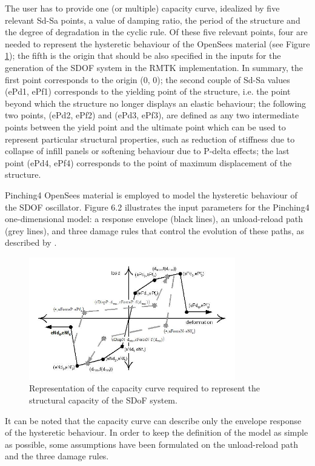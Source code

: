 The user has to provide one (or multiple) capacity curve, idealized by five relevant Sd-Sa points, a value of damping ratio, the period of the structure and the degree of degradation in the cyclic rule. Of these five relevant points, four are needed to represent the hysteretic behaviour of the OpenSees material (see Figure \ref{fig:backbone}); the fifth is the origin that should be also specified in the inputs for the generation of the SDOF system in the RMTK implementation. In summary, the first point corresponds to the origin (0, 0); the second couple of Sd-Sa values (ePd1, ePf1) corresponds to the yielding point of the structure, i.e. the point beyond which the structure no longer displays an elastic behaviour; the following two points, (ePd2, ePf2) and (ePd3, ePf3), are defined as any two intermediate points between the yield point and the ultimate point which can be used to represent particular structural properties, such as reduction of stiffness due to collapse of infill panels or softening behaviour due to P-delta effects; the last point (ePd4, ePf4) corresponds to the point of maximum displacement of the structure.

Pinching4 OpenSees material is employed to model the hysteretic behaviour of the SDOF oscillator. Figure 6.2 illustrates the input parameters for the Pinching4 one-dimensional model: a response envelope (black lines), an unload-reload path (grey lines), and three damage rules that control the evolution of these paths, as described by \citep{LowesEtAl2003}.

\begin{figure}[htb]
  \centering
      \includegraphics[width=9cm]{figures/Pinching4.jpg}
  \caption{Representation of the capacity curve required to represent the structural capacity of the SDoF system.}
  \label{fig:backbone}
\end{figure}

It can be noted that the capacity curve can describe only the envelope response of the hysteretic behaviour. In order to keep the definition of the model as simple as possible, some assumptions have been formulated on the unload-reload path and the three damage rules.\\

